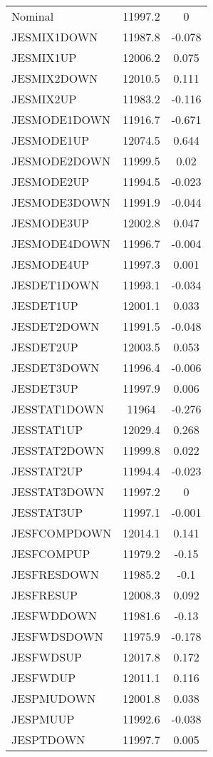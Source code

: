 \begin{center}
\begin{longtable}{|l|c|c|}
Nominal & 11997.2 & 0 \\
JESMIX1DOWN & 11987.8 & -0.078 \\
JESMIX1UP & 12006.2 & 0.075 \\
JESMIX2DOWN & 12010.5 & 0.111 \\
JESMIX2UP & 11983.2 & -0.116 \\
JESMODE1DOWN & 11916.7 & -0.671 \\
JESMODE1UP & 12074.5 & 0.644 \\
JESMODE2DOWN & 11999.5 & 0.02 \\
JESMODE2UP & 11994.5 & -0.023 \\
JESMODE3DOWN & 11991.9 & -0.044 \\
JESMODE3UP & 12002.8 & 0.047 \\
JESMODE4DOWN & 11996.7 & -0.004 \\
JESMODE4UP & 11997.3 & 0.001 \\
JESDET1DOWN & 11993.1 & -0.034 \\
JESDET1UP & 12001.1 & 0.033 \\
JESDET2DOWN & 11991.5 & -0.048 \\
JESDET2UP & 12003.5 & 0.053 \\
JESDET3DOWN & 11996.4 & -0.006 \\
JESDET3UP & 11997.9 & 0.006 \\
JESSTAT1DOWN & 11964 & -0.276 \\
JESSTAT1UP & 12029.4 & 0.268 \\
JESSTAT2DOWN & 11999.8 & 0.022 \\
JESSTAT2UP & 11994.4 & -0.023 \\
JESSTAT3DOWN & 11997.2 & 0 \\
JESSTAT3UP & 11997.1 & -0.001 \\
JESFCOMPDOWN & 12014.1 & 0.141 \\
JESFCOMPUP & 11979.2 & -0.15 \\
JESFRESDOWN & 11985.2 & -0.1 \\
JESFRESUP & 12008.3 & 0.092 \\
JESFWDDOWN & 11981.6 & -0.13 \\
JESFWDSDOWN & 11975.9 & -0.178 \\
JESFWDSUP & 12017.8 & 0.172 \\
JESFWDUP & 12011.1 & 0.116 \\
JESPMUDOWN & 12001.8 & 0.038 \\
JESPMUUP & 11992.6 & -0.038 \\
JESPTDOWN & 11997.7 & 0.005 \\

\end{longtable}
\end{center}
